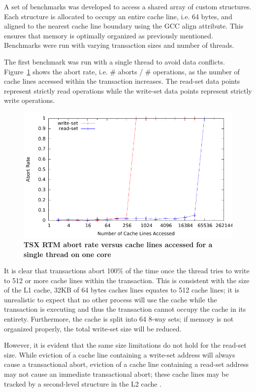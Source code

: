 \documentclass[11pt]{book}
\begin{document}
A set of benchmarks was developed to access a shared array of custom structures. Each
structure is allocated to occupy an entire cache line, i.e. 64 bytes, and aligned to the
nearest cache line boundary using the GCC align attribute.  This ensures that memory is
optimally organized as previously mentioned.  Benchmarks were run with varying transaction
sizes and number of threads.

The first benchmark was run with a single thread to avoid data conflicts.
Figure~\ref{fig:trx_size} shows the abort rate, i.e. \# aborts / \# operations, as the
number of cache lines accessed within the transaction increases.  The read-set data points
represent strictly read operations while the write-set data points represent strictly
write operations.

\begin{figure}[H]
    \centering
    \graphicspath{ {./figures/} }
    \includegraphics[totalheight=0.50\textheight,keepaspectratio]{trxSize_singleThread}
    \caption{\textbf{TSX RTM abort rate versus cache lines accessed for a single
    thread on one core}}
    \label{fig:trx_size}
\end{figure}

It is clear that transactions abort 100\% of the time once the thread tries to write to
512 or more cache lines within the transaction.  This is consistent with the size of the
L1 cache, 32KB of 64 bytes caches lines equates to 512 cache lines; it is unrealistic to
expect that no other process will use the cache while the transaction is executing and
thus the transaction cannot occupy the cache in its entirety.  Furthermore, the cache is
split into 64 8-way sets; if memory is not organized properly, the total write-set size
will be reduced.

However, it is evident that the same size limitations do not hold for the read-set size.
While eviction of a cache line containing a write-set address will always cause a
transactional abort, eviction of a cache line containing a read-set address may not cause
an immediate transactional abort; these cache lines may be tracked by a second-level
structure in the L2 cache \cite{intel_opt_man}.
\end{document}
